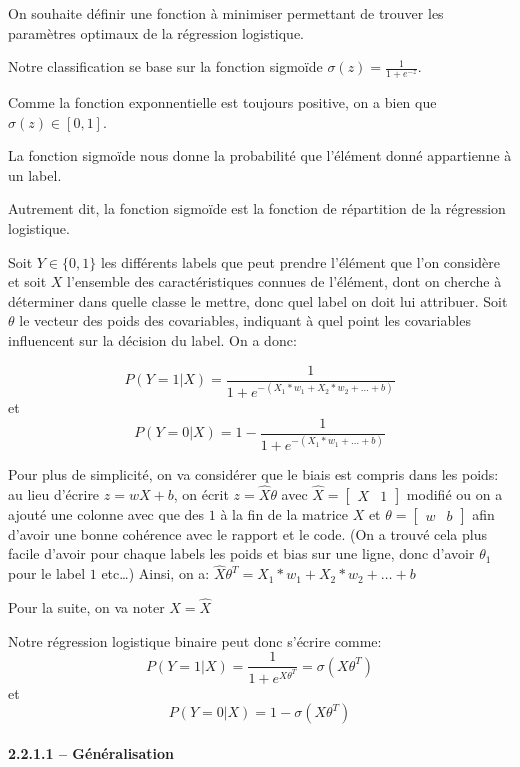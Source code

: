 \documentclass[
]{article}
\begin{document}
On souhaite définir une fonction à minimiser permettant de trouver les
paramètres optimaux de la régression logistique.

Notre classification se base sur la fonction sigmoïde
\(\sigma(z) = \frac{1}{1 + e^{-z}}\).

Comme la fonction exponnentielle est toujours positive, on a bien que
\(\sigma(z) \in [0, 1]\).

La fonction sigmoïde nous donne la probabilité que l'élément donné
appartienne à un label.

Autrement dit, la fonction sigmoïde est la fonction de répartition de la
régression logistique.

Soit \(Y \in \{0, 1\}\) les différents labels que peut prendre l'élément
que l'on considère et soit \(X\) l'ensemble des caractéristiques connues
de l'élément, dont on cherche à déterminer dans quelle classe le mettre,
donc quel label on doit lui attribuer. Soit \(\theta\) le vecteur des
poids des covariables, indiquant à quel point les covariables
influencent sur la décision du label. On a donc:

\[P(Y = 1 | X) = \frac{1}{1 + e^{-(X_1 * w_1 + X_2*w_2 + \dots + b)}}\]
et \[P(Y = 0 | X) = 1 - \frac{1}{1 + e^{-(X_1 * w_1 + \dots + b)}}\]

Pour plus de simplicité, on va considérer que le biais est compris dans
les poids: au lieu d'écrire \(z = wX + b\), on écrit
\(z = \hat{X}\theta\) avec
\(\hat{X} = \begin{bmatrix} X & 1 \end{bmatrix}\) modifié ou on a ajouté
une colonne avec que des \(1\) à la fin de la matrice \(X\) et
\(\theta = \begin{bmatrix} w & b \end{bmatrix}\) afin d'avoir une bonne
cohérence avec le rapport et le code. (On a trouvé cela plus facile
d'avoir pour chaque labels les poids et bias sur une ligne, donc d'avoir
\(\theta_1\) pour le label \(1\) etc\ldots) Ainsi, on a:
\(\hat{X} \theta^T = X_1 * w_1 + X_2 * w_2 + \dots + b\)

Pour la suite, on va noter \(X = \hat{X}\)

Notre régression logistique binaire peut donc s'écrire comme:
\[P(Y = 1 | X) = \frac{1}{1 + e^{X \theta^T}} = \sigma(X \theta^T)\] et
\[P(Y = 0 | X) = 1 - \sigma(X \theta^T)\]

\paragraph{2.2.1.1 -- Généralisation}\label{guxe9nuxe9ralisation}
\end{document}
